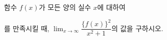 함수 $f(x)$가 모든 양의 실수 $x$에 대하여 \par\smallskip{}\par\smallskip\noindent 를 만족시킬 때, $\displaystyle\lim_{x\to\infty}\dfrac{\{f(x)\}^2}{x^2+1}$의 값을 구하시오.
